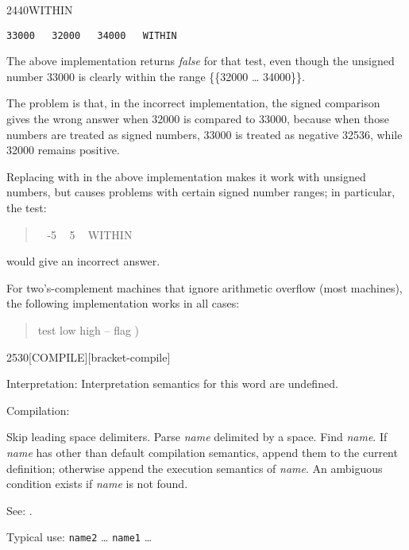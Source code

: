 \begin{newword}{2440}{WITHIN}
\begin{rationale}
		\tab \texttt{33000 ~ 32000 ~ 34000 ~ WITHIN}

		The above implementation returns \emph{false} for that test,
		even though the unsigned number 33000 is clearly within the
		range \{\{32000 {\ldots} 34000\}\}.

		The problem is that, in the incorrect implementation, the
		signed comparison  gives the wrong answer when 32000
		is compared to 33000, because when those numbers are treated
		as signed numbers, 33000 is treated as negative 32536, while
		32000 remains positive.

		Replacing  with  in the above implementation
		makes it work with unsigned numbers, but causes problems with
		certain signed number ranges; in particular, the test:
		\begin{quote} ~ -5 ~ 5 ~ WITHIN
		\end{quote}
		would give an incorrect answer.

		For two's-complement machines that ignore arithmetic overflow
		(most machines), the following implementation works in all
		cases:
		\begin{quote}\ttfamily
			\word{:}   test low high -- flag )	~
				 \word{-}  \word{-}   ~
			\word{;}
		\end{quote}
	\end{rationale}
\end{newword}


\begin{newword*}{2530}{[COMPILE]}[bracket-compile]
\item{Interpretation:}
	Interpretation semantics for this word are undefined.

\item[Compilation:]

	Skip leading space delimiters. Parse \emph{name} delimited by
	a space. Find \emph{name}. If \emph{name} has other than default
	compilation semantics, append them to the current definition;
	otherwise append the execution semantics of \emph{name}. An
	ambiguous condition exists if \emph{name} is not found.

\item[See:]
	.

	\begin{rationale} %
		Typical use:
			\word{:} \texttt{name2} {\ldots}
				\word{[COMPILE]} \texttt{name1}
			{\ldots} \word{;} ~ 
	\end{rationale}
\end{newword*}


